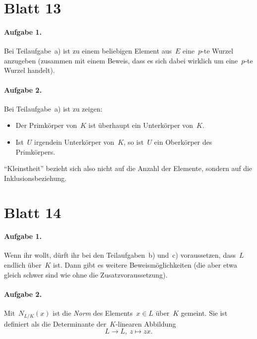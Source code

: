\documentclass{algblatt}
\newcommand{\hint}[1]{\rotatebox{180}{\vbox{\textcolor{grey}{#1}}}}
\begin{document}
\section*{Blatt 13}

\paragraph{Aufgabe 1.} Bei Teilaufgabe~a) ist zu einem beliebigen Element
aus~$E$ eine~$p$-te Wurzel anzugeben (zusammen mit einem Beweis, dass es sich
dabei wirklich um eine~$p$-te Wurzel handelt).

\hint{%
Bei Teilaufgabe~b) ist zu zeigen: $E$ ist ein Körper und die angegebene
Abbildung ist ein Ringhomomorphismus. Wieso genügt das?
}

\paragraph{Aufgabe 2.} Bei Teilaufgabe~a) ist zu zeigen:
\begin{itemize}
\item Der Primkörper von~$K$ ist überhaupt ein Unterkörper von~$K$.
\item Ist~$U$ irgendein Unterkörper von~$K$, so ist~$U$ ein Oberkörper des
Primkörpers.
\end{itemize}
"`Kleinstheit"' bezieht sich also nicht auf die Anzahl der Elemente, sondern
auf die Inklusionsbeziehung.


\section*{Blatt 14}

\paragraph{Aufgabe 1.} Wenn ihr wollt, dürft ihr bei den Teilaufgaben~b) und~c)
voraussetzen, dass~$L$ endlich über~$K$ ist. Dann gibt es weitere
Beweismöglichkeiten (die aber etwa gleich schwer sind wie ohne die
Zusatzvoraussetzung).

\paragraph{Aufgabe 2.} Mit~$N_{L/K}(x)$ ist die \emph{Norm} des Elements~$x \in
L$ über~$K$ gemeint. Sie ist definiert als die Determinante der~$K$-linearen
Abbildung
\[ L \longrightarrow L,\ z \longmapsto zx. \]
\end{document}
